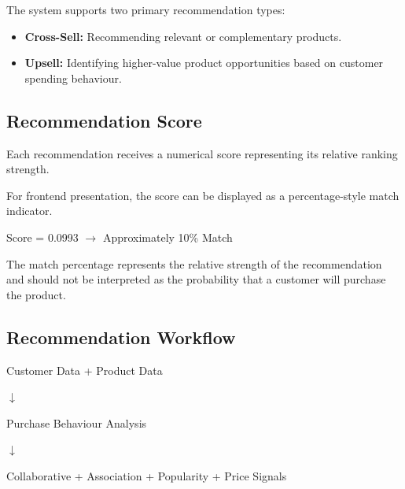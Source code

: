 \documentclass[12pt,a4paper]{report}
\begin{document}
The system supports two primary recommendation types:

\begin{itemize}[leftmargin=1.2cm]

    \item \textbf{Cross-Sell:}
    Recommending relevant or complementary products.

    \item \textbf{Upsell:}
    Identifying higher-value product opportunities based on customer
    spending behaviour.

\end{itemize}


\subsection{Recommendation Score}

Each recommendation receives a numerical score representing its
relative ranking strength.

For frontend presentation, the score can be displayed as a
percentage-style match indicator.

\begin{center}
Score = 0.0993 $\rightarrow$ Approximately 10\% Match
\end{center}

The match percentage represents the relative strength of the
recommendation and should not be interpreted as the probability that a
customer will purchase the product.


\subsection{Recommendation Workflow}

\begin{center}
Customer Data + Product Data
\end{center}

\begin{center}
$\downarrow$
\end{center}

\begin{center}
Purchase Behaviour Analysis
\end{center}

\begin{center}
$\downarrow$
\end{center}

\begin{center}
Collaborative + Association + Popularity + Price Signals
\end{center}
\end{document}
